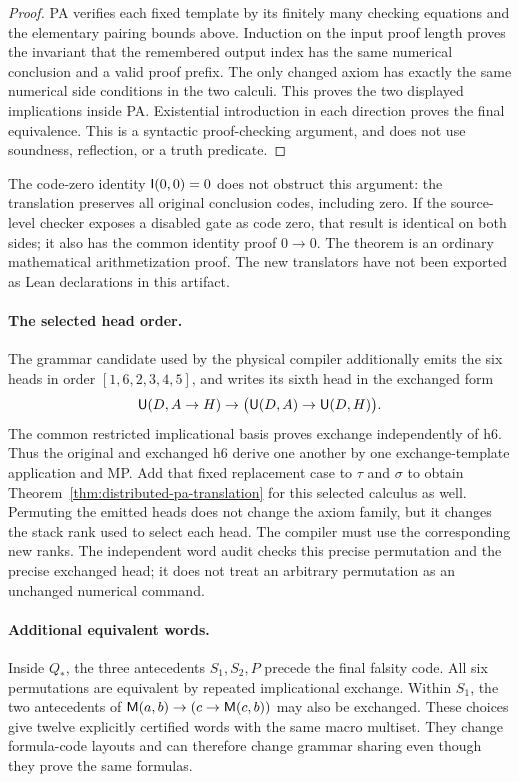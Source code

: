\begin{proof}
PA verifies each fixed template by its finitely many checking
equations and the elementary pairing bounds above. Induction on
the input proof length proves the invariant that the remembered
output index has the same numerical conclusion and a valid proof
prefix. The only changed axiom has exactly the same numerical side
conditions in the two calculi. This proves the two displayed
implications inside PA. Existential introduction in each direction
proves the final equivalence. This is a syntactic proof-checking
argument, and does not use soundness, reflection, or a truth predicate.
\end{proof}

The code-zero identity $\mathsf I(0,0)=0$ does not obstruct this argument:
the translation preserves all original conclusion codes, including
zero. If the source-level checker exposes a disabled gate as code
zero, that result is identical on both sides; it also has the common
identity proof $0\to0$. The theorem is an ordinary mathematical
arithmetization proof. The new translators have not been exported as
Lean declarations in this artifact.

\paragraph{The selected head order.}
The grammar candidate used by the physical compiler additionally
emits the six heads in order $[1,6,2,3,4,5]$, and writes its sixth head
in the exchanged form
\[
 \mathsf U(D,A\to H)\to\bigl(\mathsf U(D,A)\to\mathsf U(D,H)\bigr).
\]
The common restricted implicational basis proves exchange independently
of h6. Thus the original and exchanged h6 derive one another by one
exchange-template application and MP. Add that fixed replacement
case to $\tau$ and $\sigma$ to obtain
Theorem~\ref{thm:distributed-pa-translation} for this selected
calculus as well. Permuting the emitted heads does not change the
axiom family, but it changes the stack rank used to select each
head. The compiler must use the corresponding new ranks. The
independent word audit checks this precise permutation and the
precise exchanged head; it does not treat an arbitrary permutation
as an unchanged numerical command.

\paragraph{Additional equivalent words.}
Inside $Q_*$, the three antecedents $S_1,S_2,P$ precede the final
falsity code. All six permutations are equivalent by repeated
implicational exchange. Within $S_1$, the two antecedents of
$\mathsf M(a,b)\to(c\to\mathsf M(c,b))$ may also be exchanged.
These choices give twelve explicitly certified words with the same
macro multiset. They change formula-code layouts and can therefore
change grammar sharing even though they prove the same formulas.

